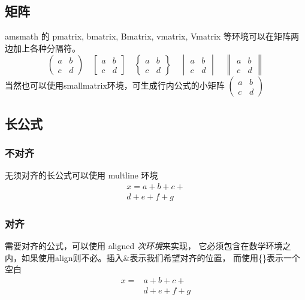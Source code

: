 \documentclass[12pt, a4paper, oneside, UTF8]{ctexart}
\begin{document}
\subsection{矩阵}
amsmath 的 pmatrix, bmatrix, Bmatrix, vmatrix, Vmatrix 
等环境可以在矩阵两边加上各种分隔符。
\begin{equation*}
\begin{pmatrix} a&b\\c&d \end{pmatrix} \quad
\begin{bmatrix} a&b\\c&d \end{bmatrix} \quad
\begin{Bmatrix} a&b\\c&d \end{Bmatrix} \quad
\begin{vmatrix} a&b\\c&d \end{vmatrix} \quad
\begin{Vmatrix} a&b\\c&d \end{Vmatrix}
\end{equation*}
当然也可以使用smallmatrix环境，可生成行内公式的小矩阵
$ ( \begin{smallmatrix} a&b\\c&d \end{smallmatrix} ) $
\subsection{长公式}
\subsubsection{不对齐}
无须对齐的长公式可以使用 multline 环境
\begin{multline*}
    x = a+b+c+{} \\
    d+e+f+g
\end{multline*}
\subsubsection{对齐}
需要对齐的公式，可以使用 aligned \textit{次环境}来实现，
它必须包含在数学环境之内，如果使用align则不必。插入\&表示我们希望对齐的位置，
而使用\{\}表示一个空白
\begin{equation*} 
    \begin{aligned}
        x ={}&a+b+c+ \\
             &d+e+f+g
    \end{aligned}
\end{equation*}
\end{document}
